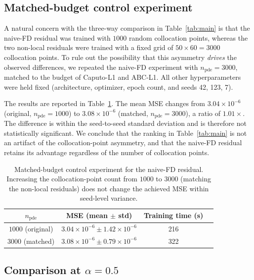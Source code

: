 \documentclass[11pt]{article}
\begin{document}
\subsection{Matched-budget control experiment}
\label{sec:matched_budget}

A natural concern with the three-way comparison in
Table~\ref{tab:main} is that the naive-FD residual was trained with
\(1000\) random collocation points, whereas the two non-local residuals
were trained with a fixed grid of \(50\times 60 = 3000\) collocation
points. To rule out the possibility that this asymmetry
\emph{drives} the observed differences, we repeated the naive-FD
experiment with \(n_{\mathrm{pde}} = 3000\), matched to the budget of
Caputo-L1 and ABC-L1. All other hyperparameters were held fixed
(architecture, optimizer, epoch count, and seeds 42, 123, 7).

The results are reported in Table~\ref{tab:matched_budget}. The mean
MSE changes from \(3.04\times 10^{-6}\) (original, \(n_{\mathrm{pde}}=1000\))
to \(3.08\times 10^{-6}\) (matched, \(n_{\mathrm{pde}}=3000\)), a
ratio of \(1.01\times\). The difference is within the seed-to-seed
standard deviation and is therefore not statistically significant. We
conclude that the ranking in Table~\ref{tab:main} is not an artifact
of the collocation-point asymmetry, and that the naive-FD residual
retains its advantage regardless of the number of collocation points.

\begin{table}[h]
\centering
\caption{Matched-budget control experiment for the naive-FD residual.
         Increasing the collocation-point count from \(1000\) to
         \(3000\) (matching the non-local residuals) does not change
         the achieved MSE within seed-level variance.}
\label{tab:matched_budget}
\begin{tabular}{cccc}
\toprule
\(n_{\mathrm{pde}}\) & MSE (mean \(\pm\) std) & Training time (s) \\
\midrule
\(1000\) (original)     & \(3.04\times 10^{-6} \pm 1.42\times 10^{-6}\) & 216 \\
\(3000\) (matched)      & \(3.08\times 10^{-6} \pm 0.79\times 10^{-6}\) & 322 \\
\bottomrule
\end{tabular}
\end{table}

\subsection{Comparison at \(\alpha = 0.5\)}
\label{sec:alpha05}
\end{document}
